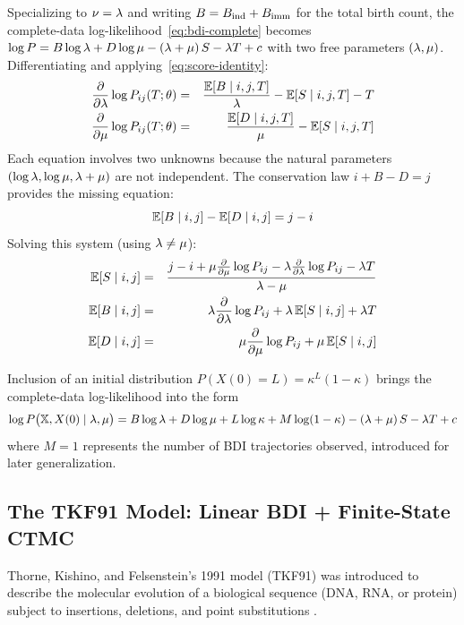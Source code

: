 Specializing to $\nu = \lambda$ and writing $B = B_{\mathrm{ind}} + B_{\mathrm{imm}}$ for the total birth count,
the complete-data log-likelihood~\eqref{eq:bdi-complete} becomes
$\log P = B \log\lambda + D \log\mu - (\lambda+\mu)\,S - \lambda T + c$
with two free parameters $(\lambda, \mu)$.
Differentiating and applying~\eqref{eq:score-identity}:
\begin{eqnarray*}
\frac{\partial}{\partial \lambda} \log P_{ij}(T;\theta) & = & \frac{\mathbb{E}[B \mid i,j,T]}{\lambda} - \mathbb{E}[S \mid i,j,T] - T \\
\frac{\partial}{\partial \mu} \log P_{ij}(T;\theta) & = & \frac{\mathbb{E}[D \mid i,j,T]}{\mu} - \mathbb{E}[S \mid i,j,T]
\end{eqnarray*}
Each equation involves two unknowns because the natural parameters $(\log\lambda, \log\mu, \lambda+\mu)$
are not independent.
The conservation law $i + B - D = j$ provides the missing equation:
\begin{equation}\label{eq:conservation}
\mathbb{E}[B \mid i,j] - \mathbb{E}[D \mid i,j] = j - i
\end{equation}
Solving this system (using $\lambda \neq \mu$):
\begin{eqnarray*}
\mathbb{E}[S \mid i,j] & = & \frac{j - i
  + \mu \frac{\partial}{\partial \mu} \log P_{ij}
  - \lambda \frac{\partial}{\partial \lambda} \log P_{ij}
  - \lambda T}{\lambda - \mu} \\
\mathbb{E}[B \mid i,j] & = & \lambda \frac{\partial}{\partial \lambda} \log P_{ij} + \lambda\, \mathbb{E}[S \mid i,j] + \lambda T \\
\mathbb{E}[D \mid i,j] & = & \mu \frac{\partial}{\partial \mu} \log P_{ij} + \mu\, \mathbb{E}[S \mid i,j]
\end{eqnarray*}

Inclusion of an initial distribution
$P(X(0)=L) = \kappa^L (1-\kappa)$ brings the complete-data log-likelihood into the form
\[
\log P\bigl(\mathbb{X}, X(0) \mid \lambda,\mu\bigr)
  = B \log\lambda + D \log\mu + L \log \kappa + M \log(1-\kappa)
    - (\lambda+\mu)\,S - \lambda T + c
\]
where $M=1$ represents the number of BDI trajectories observed, introduced for later generalization.


\subsection{The TKF91 Model: Linear BDI + Finite-State CTMC}

Thorne, Kishino, and Felsenstein's 1991 model (TKF91) was introduced
to describe the molecular evolution of a biological sequence (DNA, RNA, or protein)
subject to insertions, deletions, and point substitutions \cite{ThorneEtAl91}.


